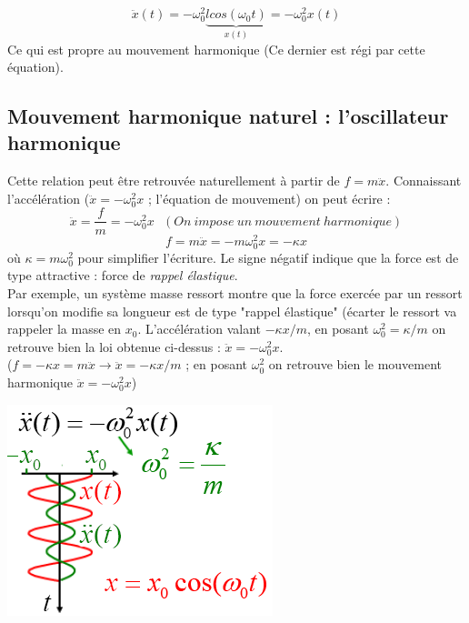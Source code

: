 \documentclass	[11pt, a4paper, openany]{book}
\begin{document}
\begin{equation}
\ddot{x}(t) = -\omega_0^2 \underbrace{l cos(\omega_0 t)}_{x(t)} = - \omega_0^2 x(t)
\end{equation}
Ce qui est propre au mouvement harmonique (Ce dernier est régi par cette équation).

\subsection{Mouvement harmonique naturel : l'oscillateur harmonique}
Cette relation peut être retrouvée naturellement à partir de $f = m\ddot{x}$. Connaissant l'accélération ($\ddot{x} = -\omega_0^2 x$ ; l'équation de mouvement) on peut écrire :
\begin{equation}
\ddot{x} = \frac{f}{m} = -\omega_0^2 x\ \ \ (On\ impose\ un\ mouvement\ harmonique)
\end{equation}
\begin{equation}
f = m \ddot{x} = -m\omega_0^2 x = -\kappa x
\end{equation}
où $\kappa = m\omega_0^2$ pour simplifier l'écriture. Le signe négatif indique que la force est de type attractive : force de \textit{rappel élastique}.\\

Par exemple, un système masse ressort montre que la force exercée par un ressort lorsqu'on modifie sa longueur est de type "rappel élastique" (écarter le ressort va rappeler la masse en $x_0$. L'accélération valant $-\kappa x/m$, en posant $\omega_0^2 = \kappa /m$ on retrouve bien la loi obtenue ci-dessus : $\ddot{x} = -\omega_0^2x$.\\
($f = -\kappa x = m\ddot{x} \rightarrow \ddot{x} = -\kappa x/m$ ; en posant $\omega_0^2$ on retrouve bien le mouvement harmonique $\ddot{x} = -\omega_0^2x$)

\begin{center}
\includegraphics[scale=0.55]{oo/image1.png}
\end{center}
\end{document}
